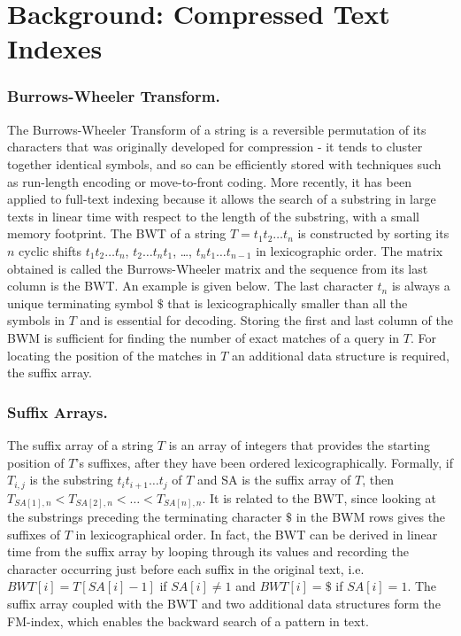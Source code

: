 \documentclass[runningheads,a4paper]{llncs}
\begin{document}
\section{Background: Compressed Text Indexes}

\subsubsection{Burrows-Wheeler Transform.}
The Burrows-Wheeler Transform of a string is a reversible permutation of its characters that was originally developed for compression \cite{bwt}- it tends to cluster together identical symbols, and so can be efficiently stored with techniques such as run-length encoding or move-to-front coding. More recently, it has been applied to full-text indexing because it allows the search of a substring in large texts in linear time with respect to the length of the substring, with a small memory footprint. The BWT of a string $T=t_1t_2 \ldots t_n$ is constructed by sorting its $n$ cyclic shifts $t_1t_2 \ldots t_n$, $t_2 \ldots t_n t_1$, \ldots,  $t_n t_1 \ldots t_{n-1}$ in lexicographic order. The matrix obtained is called the Burrows-Wheeler matrix and the sequence from its last column is the BWT. An example is given below. The last character $t_n$ is always a unique terminating symbol $\$$ that is lexicographically smaller than all the symbols in $T$ and is essential for decoding. Storing the first and last column of the BWM is sufficient for finding the number of exact matches of a query in $T$. For locating the position of the matches in $T$ an additional data structure is required, the suffix array. 

\subsubsection{Suffix Arrays.} The suffix array of a string $T$ is an array of integers that provides the starting position of $T$'s suffixes, after they have been ordered lexicographically. Formally, if $T_{i,j}$ is the substring $t_i t_{i+1} \ldots t_j$ of $T$ and SA is the suffix array of $T$, then $T_{SA[1],n}<T_{SA[2],n}<\ldots <T_{SA[n],n}$. It is related to the BWT, since looking at the substrings preceding the terminating character $\$$ in the BWM rows gives the suffixes of $T$ in lexicographical order. In fact, the BWT can be derived in linear time from the suffix array by looping through its values and recording the character occurring just before each suffix in the original text, i.e. $BWT[i]=T[SA[i]-1]$ if $SA[i]\neq1$ and $BWT[i]=\$$ if $SA[i]=1$. The suffix array coupled with the BWT and two additional data structures form the FM-index, which enables the backward search of a pattern in text.
\end{document}
